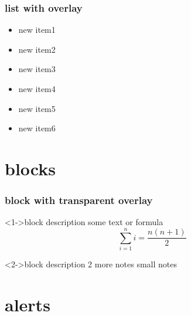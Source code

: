 \documentclass{beamer}
\begin{document}
% 
\begin{frame}
\frametitle{list with overlay}
\begin{itemize}
\item<1-> new item1
\item<1-> new item2
\item<2-> new item3
\item<3-> new item4
\item<4-> new item5
\item<4-> new item6
\end{itemize}
\end{frame}

% 
\section{blocks}
\begin{frame}
  \tableofcontents[currentsection]
\end{frame}

% 
\begin{frame}
\frametitle{block with transparent overlay}


\begin{block}<1->{block description}
  some text or formula $$\sum\limits_{i=1}^n i = \frac{n (n+1)}{2}$$
\end{block}

\begin{block}<2->{block description 2}
  more notes {\tiny small notes}
\end{block}

\end{frame}

% 
\section{alerts}
\begin{frame}
  \tableofcontents[currentsection]
\end{frame}
\end{document}
